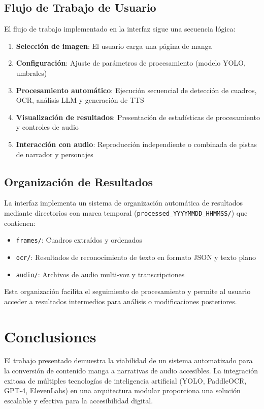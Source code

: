\documentclass[conference]{IEEEtran}
\begin{document}
\subsection{Flujo de Trabajo de Usuario}
El flujo de trabajo implementado en la interfaz sigue una secuencia lógica:
\begin{enumerate}
\item \textbf{Selección de imagen}: El usuario carga una página de manga
\item \textbf{Configuración}: Ajuste de parámetros de procesamiento (modelo YOLO, umbrales)
\item \textbf{Procesamiento automático}: Ejecución secuencial de detección de cuadros, OCR, análisis LLM y generación de TTS
\item \textbf{Visualización de resultados}: Presentación de estadísticas de procesamiento y controles de audio
\item \textbf{Interacción con audio}: Reproducción independiente o combinada de pistas de narrador y personajes
\end{enumerate}

\subsection{Organización de Resultados}
La interfaz implementa un sistema de organización automática de resultados mediante directorios con marca temporal (\texttt{processed\_YYYYMMDD\_HHMMSS/}) que contienen:
\begin{itemize}
\item \texttt{frames/}: Cuadros extraídos y ordenados
\item \texttt{ocr/}: Resultados de reconocimiento de texto en formato JSON y texto plano
\item \texttt{audio/}: Archivos de audio multi-voz y transcripciones
\end{itemize}

Esta organización facilita el seguimiento de procesamiento y permite al usuario acceder a resultados intermedios para análisis o modificaciones posteriores.

\section{Conclusiones}
El trabajo presentado demuestra la viabilidad de un sistema automatizado para la conversión de contenido manga a narrativas de audio accesibles. La integración exitosa de múltiples tecnologías de inteligencia artificial (YOLO, PaddleOCR, GPT-4, ElevenLabs) en una arquitectura modular proporciona una solución escalable y efectiva para la accesibilidad digital.
\end{document}
